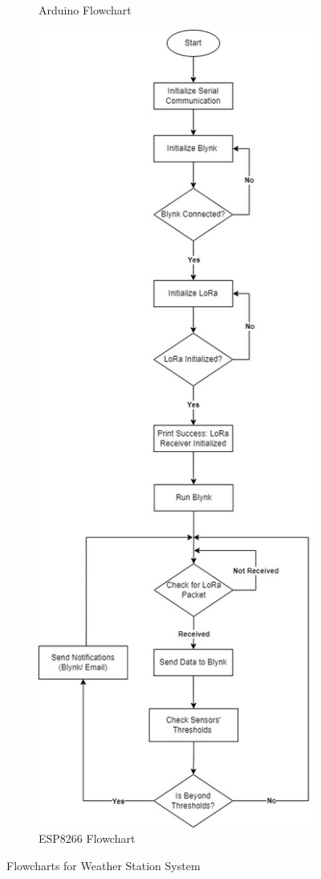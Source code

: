 \documentclass[conference, onecolumn]{IEEEtran}
\begin{document}
\begin{figure}[H]
\begin{subfigure}{0.45\textwidth}
        \caption{Arduino Flowchart}
        \label{fig:arduino_flowchart}
    \end{subfigure}
    \hfill
    \begin{subfigure}{0.45\textwidth}
        \centering
        \includegraphics[width=0.72\linewidth]{figures/Weather_Station-ESP8266_Flowchart.jpg}
        \caption{ESP8266 Flowchart}
        \label{fig:esp8266_flowchart}
    \end{subfigure}
    \caption{Flowcharts for Weather Station System}
    \label{fig:weather_station_flowchart}
\end{figure}
\end{document}
